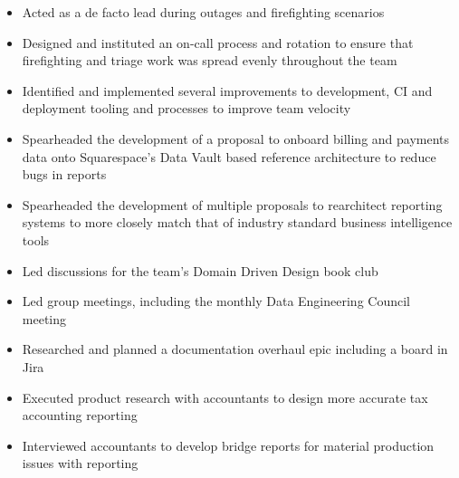 \begin{itemize}
  \item Acted as a de facto lead during outages and firefighting scenarios
  \item Designed and instituted an on-call process and rotation to ensure that
    firefighting and triage work was spread evenly throughout the team
  \item Identified and implemented several improvements to development, CI and deployment
    tooling and processes to improve team velocity
  \item Spearheaded the development of a proposal to onboard billing and
    payments data onto Squarespace's Data Vault based reference architecture to
    reduce bugs in reports
  \item Spearheaded the development of multiple proposals to rearchitect
    reporting systems to more closely match that of industry standard business
    intelligence tools
  \item Led discussions for the team's Domain Driven Design book club
  \item Led group meetings, including the monthly Data Engineering Council
    meeting
  \item Researched and planned a documentation overhaul epic including a board
  in Jira
  \item Executed product research with accountants to design more accurate tax
  accounting reporting
  \item Interviewed accountants to develop bridge reports for material
    production issues with reporting
\end{itemize}

